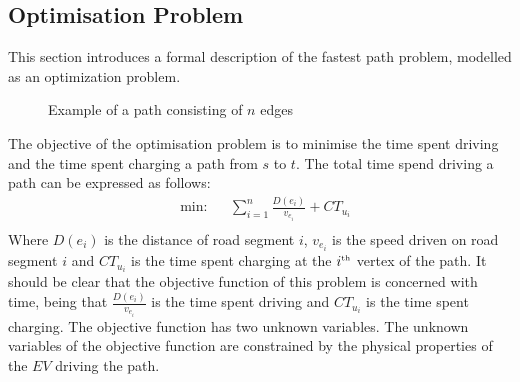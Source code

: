 \subsection{Optimisation Problem}\label{sec:optiprob}
This section introduces a formal description of the fastest path problem, modelled as an optimization problem.

\begin{figure}[h!]
\centering
    \caption{Example of a path consisting of $n$ edges} \label{fig:pathexample}
\end{figure}

The objective of the optimisation problem is to minimise the time spent driving
and the time spent charging a path from $s$ to $t$. The total time spend driving a path can be expressed as follows:
\begin{equation*}
\begin{aligned} &
{\text{min:}}
& & \sum_{i=1}^{n} \frac{D(e_i)}{v_{e_i}} + CT_{u_i} \\
\end{aligned}
\end{equation*}\label{eq:objfunction}
Where $D(e_i)$ is the distance of road segment $i$, $v_{e_i}$ is the speed driven on road segment $i$ and $CT_{u_i}$ is the time spent charging at the $i^{\text{\tiny th}}$ vertex of the path. It should be clear that the objective function of this problem is concerned with time, being that $\frac{D(e_i)}{v_{e_i}}$ is the time spent driving and $CT_{u_i}$ is the time spent charging. The objective function has two unknown variables. The unknown variables of the objective function are constrained by the physical properties of the $EV$ driving the path.

